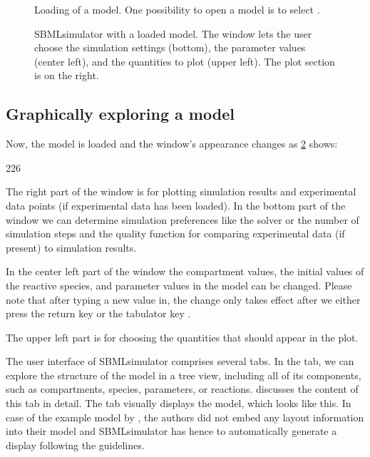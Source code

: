 \begin{figure}[t]
\centering
{}
\caption[Loading of a model]{Loading of a model.
One possibility to open a model is to select .}
\label{fig:openModel}
\end{figure}
\begin{figure}[t]
\centering
{}
\caption[SBMLsimulator with a loaded model]{SBMLsimulator with a loaded model.
The window lets the user choose the simulation settings (bottom), the parameter values (center left), and the quantities to plot (upper left).
The plot section is on the right.}
\label{fig:modelOpened}
\end{figure}

\subsection{Graphically exploring a model}

Now, the model is loaded and the window's appearance changes as \cref{fig:modelOpened} shows:
\begin{dinglist}{226}
  \item The right part of the window is for plotting simulation results and experimental data points (if experimental data has been loaded).
In the bottom part of the window we can determine simulation preferences like the solver or the number of simulation steps and the quality function for comparing experimental data (if present) to simulation results.
  \item In the center left part of the window the compartment values, the initial values of the reactive species, and parameter values in the model can be changed.
  Please note that after typing a new value in, the change only takes effect after we either press the return key \keys{\return} or the tabulator key \keys{\tab}.
  \item The upper left part is for choosing the quantities that should appear in the plot.
\end{dinglist}
The user interface of SBMLsimulator comprises several tabs.
In the  tab, we can explore the structure of the model in a tree view, including all of its components, such as compartments, species, parameters, or reactions.
 discusses the content of this tab in detail.
The  tab visually displays the model, which looks like this.
In case of the example model by \citeauthor{Bucher2011}, the authors did not embed any layout information into their model and SBMLsimulator has hence to automatically generate a display following the \SBGN guidelines.

